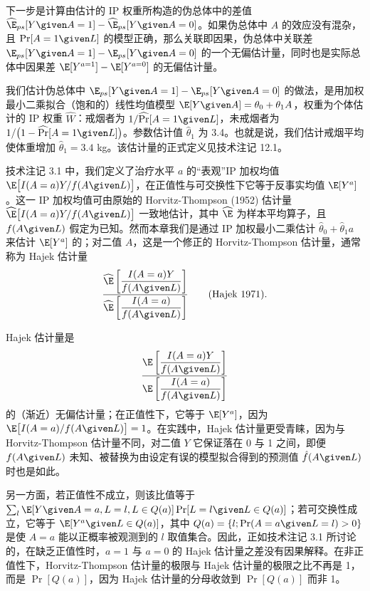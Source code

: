 下一步是计算由估计的 IP 权重所构造的伪总体中的差值 $\widehat{\E}_{ps}[Y\given A=1]-\widehat{\E}_{ps}[Y\given A=0]$。如果伪总体中 $A$ 的效应没有混杂，且 $\Pr[A=1\given L]$ 的模型正确，那么关联即因果，伪总体中关联差 $\E_{ps}[Y\given A=1]-\E_{ps}[Y\given A=0]$ 的一个无偏估计量，同时也是实际总体中因果差 $\E[Y^{a=1}]-\E[Y^{a=0}]$ 的无偏估计量。

我们估计伪总体中 $\E_{ps}[Y\given A=1]-\E_{ps}[Y\given A=0]$ 的做法，是用加权最小二乘拟合（饱和的）线性均值模型 $\E[Y\given A]=\theta_0+\theta_1A$，权重为个体估计的 IP 权重 $\widehat{W}$：戒烟者为 $1/\widehat{\Pr}[A=1\given L]$，未戒烟者为 $1/\bigl(1-\widehat{\Pr}[A=1\given L]\bigr)$。参数估计值 $\hat\theta_1$ 为 3.4。也就是说，我们估计戒烟平均使体重增加 $\hat\theta_1=3.4$ kg。该估计量的正式定义见技术注记 12.1。

\renewcommand{\TPname}{技术注记（Technical Point）}
\begin{techpoint}
技术注记 3.1 中，我们定义了治疗水平 $a$ 的“表观”IP 加权均值 $\E\bigl[I(A=a)Y/f(A\given L)\bigr]$，在正值性与可交换性下它等于反事实均值 $\E[Y^{a}]$。这一 IP 加权均值可由原始的 Horvitz-Thompson (1952) 估计量 $\widehat{\E}\bigl[I(A=a)Y/f(A\given L)\bigr]$ 一致地估计，其中 $\widehat{\E}$ 为样本平均算子，且 $f(A\given L)$ 假定为已知。然而本章我们是通过 IP 加权最小二乘估计 $\hat\theta_0+\hat\theta_1a$ 来估计 $\E[Y^{a}]$ 的；对二值 $A$，这是一个修正的 Horvitz-Thompson 估计量，通常称为 Hajek 估计量
\[
\frac{\widehat{\E}\left[\dfrac{I(A=a)Y}{f(A\given L)}\right]}{\widehat{\E}\left[\dfrac{I(A=a)}{f(A\given L)}\right]}
\qquad\text{(Hajek 1971).}
\]

Hajek 估计量是
\[
\frac{\E\left[\dfrac{I(A=a)Y}{f(A\given L)}\right]}{\E\left[\dfrac{I(A=a)}{f(A\given L)}\right]}
\]
的（渐近）无偏估计量；在正值性下，它等于 $\E[Y^{a}]$，因为 $\E\bigl[I(A=a)/f(A\given L)\bigr]=1$。在实践中，Hajek 估计量更受青睐，因为与 Horvitz-Thompson 估计量不同，对二值 $Y$ 它保证落在 0 与 1 之间，即便 $f(A\given L)$ 未知、被替换为由设定有误的模型拟合得到的预测值 $\hat f(A\given L)$ 时也是如此。

另一方面，若正值性不成立，则该比值等于 $\sum_l \E[Y\given A=a,L=l,L\in Q(a)]\Pr[L=l\given L\in Q(a)]$；若可交换性成立，它等于 $\E[Y^{a}\given L\in Q(a)]$，其中 $Q(a)=\{l;\Pr(A=a\given L=l)>0\}$ 是使 $A=a$ 能以正概率被观测到的 $l$ 取值集合。因此，正如技术注记 3.1 所讨论的，在缺乏正值性时，$a=1$ 与 $a=0$ 的 Hajek 估计量之差没有因果解释。在非正值性下，Horvitz-Thompson 估计量的极限与 Hajek 估计量的极限之比不再是 1，而是 $\Pr[Q(a)]$，因为 Hajek 估计量的分母收敛到 $\Pr[Q(a)]$ 而非 1。
\end{techpoint}
\renewcommand{\TPname}{技术注记}

